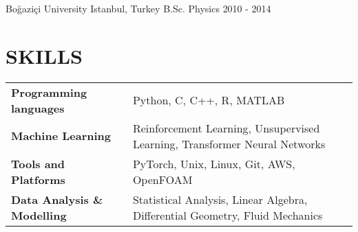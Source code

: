 \documentclass[letterpaper,11pt]{article}
\begin{document}
    \vspace{-4pt}

    \resumeSubheading
      {Boğaziçi University}
      {Istanbul, Turkey}
      {B.Sc. Physics}
      {2010 - 2014}
      \resumeItemListStart
      \resumeItemListEnd

  \resumeSubHeadingListEnd
  \vspace{-10pt}
\section{SKILLS}

  \begin{multicols}{2}
    \begin{tabular}{ p{5.4cm} p{14.3cm}}
      \textbf{Programming languages}    & Python, C, C++, R, MATLAB \\
      \textbf{Machine Learning}         & Reinforcement Learning, Unsupervised Learning, Transformer Neural Networks \\
      \textbf{Tools and Platforms}         & PyTorch, Unix, Linux, Git, AWS, OpenFOAM \\
      \textbf{Data Analysis \& Modelling}         & Statistical Analysis, Linear Algebra, Differential Geometry, Fluid Mechanics \\
    \end{tabular}
  \end{multicols}

%
\printbibliography[title = PUBLICATIONS]
\vspace{-8pt}
\end{document}

